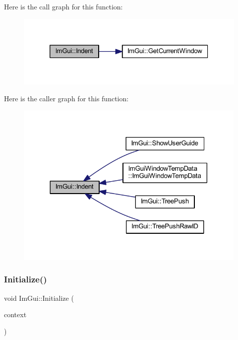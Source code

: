 Here is the call graph for this function\+:
\nopagebreak
\begin{figure}[H]
\begin{center}
\leavevmode
\includegraphics[width=320pt]{namespace_im_gui_a6c7b9f2d60951462eeebad80154a8926_cgraph}
\end{center}
\end{figure}
Here is the caller graph for this function\+:
\nopagebreak
\begin{figure}[H]
\begin{center}
\leavevmode
\includegraphics[width=317pt]{namespace_im_gui_a6c7b9f2d60951462eeebad80154a8926_icgraph}
\end{center}
\end{figure}
\mbox{\label{namespace_im_gui_a2e1fd6aabbb02f367fd6aee248506782}} 
\subsubsection{\texorpdfstring{Initialize()}{Initialize()}}
{\footnotesize\ttfamily void Im\+Gui\+::\+Initialize (\begin{DoxyParamCaption}\item[{\mbox{\hyperlink{struct_im_gui_context}{Im\+Gui\+Context}} $\ast$}]{context }\end{DoxyParamCaption})}

